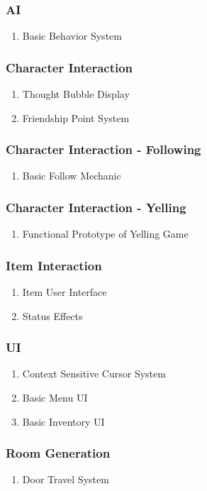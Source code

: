 \subsubsection{AI}
\begin{enumerate}
\item Basic Behavior System
\end{enumerate}
\subsubsection{Character Interaction}
\begin{enumerate}
\item Thought Bubble Display
\item Friendship Point System
\end{enumerate}
\subsubsection{Character Interaction - Following}
\begin{enumerate}
\item Basic Follow Mechanic
\end{enumerate}
\subsubsection{Character Interaction - Yelling}
\begin{enumerate}
\item Functional Prototype of Yelling Game
\end{enumerate}
\subsubsection{Item Interaction}
\begin{enumerate}
\item Item User Interface
\item Status Effects
\end{enumerate}
\subsubsection{UI}
\begin{enumerate}
\item Context Sensitive Cursor System
\item Basic Menu UI
\item Basic Inventory UI
\end{enumerate}
\subsubsection{Room Generation}
\begin{enumerate}
\item Door Travel System
\end{enumerate}
